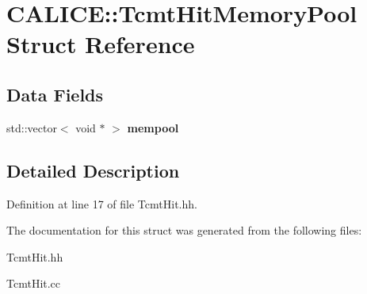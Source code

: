 \section{CALICE::TcmtHitMemoryPool Struct Reference}
\label{structCALICE_1_1TcmtHitMemoryPool}
\subsection*{Data Fields}
\begin{DoxyCompactItemize}
\item 
std::vector$<$ void $\ast$ $>$ {\bfseries mempool}\label{structCALICE_1_1TcmtHitMemoryPool_a41a4855621ec1975f0ec3f956087bd28}

\end{DoxyCompactItemize}


\subsection{Detailed Description}


Definition at line 17 of file TcmtHit.hh.

The documentation for this struct was generated from the following files:\begin{DoxyCompactItemize}
\item 
TcmtHit.hh\item 
TcmtHit.cc\end{DoxyCompactItemize}
